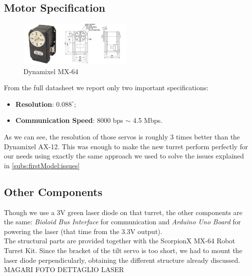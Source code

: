 \subsection{Motor Specification}
\begin{figure}
	\centering
	\includegraphics[width=0.5\textwidth]{img/mx64.png}%
	\caption{Dynamixel MX-64}
	\label{fig:mx64}
\end{figure}
From the full datasheet \cite{datasheet-MX64} we report only two important specifications:
\begin{itemize}
    \item \textbf{Resolution}: $0.088^{\circ}$;
    \item \textbf{Communication Speed}: 8000 bps $\sim$ 4.5 Mbps.
\end{itemize}
As we can see, the resolution of those servos is roughly 3 times better than the Dynamixel AX-12. This was enough to make the new turret perform perfectly for our needs using exactly the same approach we used to solve the issues explained in \ref{subs:firstModel:issues}
\subsection{Other Components}
Though we use a 3V green laser diode on that turret, the other components are the same: \emph{Bioloid Bus Interface} for communication and \emph{Arduino Uno Board} for powering the laser (that time from the 3.3V output).\\
The structural parts are provided together with the ScorpionX MX-64 Robot Turret Kit. Since the bracket of the tilt servo is too short, we had to mount the laser diode perpendicularly, obtaining the different structure already discussed. MAGARI FOTO DETTAGLIO LASER
